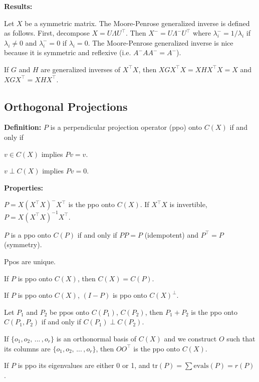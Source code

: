 \documentclass[letterpaper,11pt]{article}
\newenvironment{packed_item}{
\begin{itemize}
  \setlength{\itemsep}{1pt}
  \setlength{\parskip}{0pt}
  \setlength{\parsep}{0pt}
}{\end{itemize}}
\renewcommand{\t}{^\intercal} %
\newcommand{\1}{\mathbf{1}} %
\begin{document}
\textbf{Results:}
\begin{packed_item}
\item Let $X$ be a symmetric matrix. The Moore-Penrose generalized inverse is defined as follows. First, decompose $X = U \Lambda U^\intercal$. Then $X^{-} = U \Lambda^{-} U^\intercal$ where $\lambda^{-}_i = 1/\lambda_i$ if $\lambda_i \neq 0$ and $\lambda^{-}_i = 0$ if $\lambda_i = 0$. The Moore-Penrose generalized inverse is nice because it is symmetric and reflexive (i.e. $A^{-} A A^{-} = A^{-}$). 
\item If $G$ and $H$ are generalized inverses of $X^\intercal X$, then $XGX^\intercal X = XHX^\intercal X = X$ and $XGX^\intercal = XHX^\intercal$. 
\end{packed_item}

\subsection{Orthogonal Projections}
\textbf{Definition:} $P$ is a perpendicular projection operator (ppo) onto $C(X)$ if and only if
\begin{packed_item}
\item $v \in C(X)$ implies $Pv = v$.
\item $v \perp C(X)$ implies $Pv = 0$.
\end{packed_item}

\textbf{Properties:}
\begin{packed_item}
\item $P = X (X\t X)^- X\t$ is the ppo onto $C(X)$. If $X \t X$ is
  invertible, $P = X (X\t X)^{-1} X\t$. 
\item $P$ is a ppo onto $C(P)$ if and only if $PP = P$ (idempotent) and $P^\intercal = P$ (symmetry). 
\item Ppos are unique. 
\item If $P$ is ppo onto $C(X)$, then $C(X) = C(P)$. 
\item If $P$ is ppo onto $C(X)$, $(I - P)$ is ppo onto $C(X)^\perp$. 
\item Let $P_1$ and $P_2$ be ppos onto $C(P_1)$, $C(P_2)$, then $P_1 +
  P_2$ is the ppo onto $C(P_1,P_2)$ if and only if $C(P_1) \perp
  C(P_2)$.
\item If $\{o_1, o_2, \, ... \, , o_r\}$ is an orthonormal basis of $C(X)$
  and we construct $O$ such that its columns are $\{ o_1, o_2, \, ... \,
  , o_r \}$, then $O O \t$ is the ppo onto $C(X)$.
\item If $P$ is ppo its eigenvalues are either 0 or 1, and $\mathrm{tr}(P) = \sum \mathrm{evals}(P) = r(P)$.
\end{packed_item}
\end{document}
